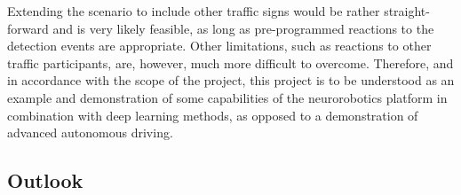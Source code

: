 Extending the scenario to include other traffic signs would be rather straight-forward and is very likely feasible, as long as pre-programmed reactions to the detection events are appropriate. 
Other limitations, such as reactions to other traffic participants, are, however, much more difficult to overcome.
Therefore, and in accordance with the scope of the project, this project is to be understood as an example and demonstration of some capabilities of the neurorobotics platform in combination with deep learning methods, as opposed to a demonstration of advanced autonomous driving.


\subsection{Outlook}
